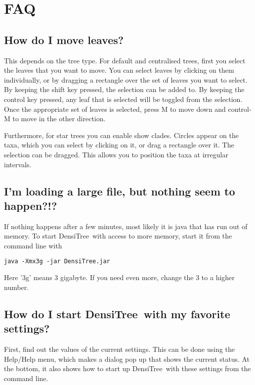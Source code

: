 \documentclass{article}
\def\DensiTree{DensiTree}
\begin{document}
\newpage
\section{FAQ\label{sec.faq}}

\subsection{How do I move leaves?}

This depends on the tree type. For default and centralised trees, first you select the leaves that you want to move.
You can select leaves by clicking on them individually, or by dragging a rectangle
over the set of leaves you want to select. By keeping the shift key pressed, the
selection can be added to. By keeping the control key pressed, any leaf that is
selected will be toggled from the selection. Once the appropriate set of leaves
is selected, press M to move down and control-M to move in the other direction.

Furthermore, for star trees you can enable show clades. Circles appear on the taxa,
which you can select by clicking on it, or drag a rectangle over it. The selection
can be dragged. This allows you to position the taxa at irregular intervals.


\subsection{I'm loading a large file, but nothing seem to happen?!?}

If nothing happens after a few minutes, most likely it is java that has run out
of memory. To start \DensiTree\ with access to more memory, start it from the 
command line with

\begin{verbatim}java -Xmx3g -jar DensiTree.jar\end{verbatim}

Here '3g' means 3 gigabyte. If you need even more, change the 3 to a higher number.


\subsection{How do I start \DensiTree\ with my favorite settings?}
First, find out the values of the current settings. This can be done
using the Help/Help menu, which makes a dialog pop up that shows the
current status. At the bottom, it also shows how to start up \DensiTree\ 
with these settings from the command line.
\end{document}
